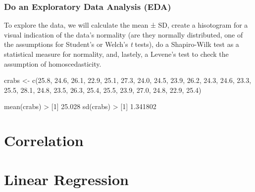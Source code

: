 \documentclass[
  letterpaper,
]{book}
\newenvironment{Shaded}{\begin{snugshade}}{\end{snugshade}}
\newcommand{\DecValTok}[1]{\textcolor[rgb]{0.68,0.00,0.00}{#1}}
\newcommand{\FloatTok}[1]{\textcolor[rgb]{0.68,0.00,0.00}{#1}}
\newcommand{\FunctionTok}[1]{\textcolor[rgb]{0.28,0.35,0.67}{#1}}
\newcommand{\NormalTok}[1]{\textcolor[rgb]{0.00,0.23,0.31}{#1}}
\newcommand{\OtherTok}[1]{\textcolor[rgb]{0.00,0.23,0.31}{#1}}
\newcommand{\SpecialCharTok}[1]{\textcolor[rgb]{0.37,0.37,0.37}{#1}}
\begin{document}
\subsection{Do an Exploratory Data Analysis
(EDA)}\label{do-an-exploratory-data-analysis-eda}

To explore the data, we will calculate the mean ± SD, create a
hisotogram for a visual indication of the data's normality (are they
normally distributed, one of the assumptions for Student's or Welch's
\emph{t} tests), do a Shapiro-Wilk test as a statistical measure for
normality, and, lastely, a Levene's test to check the assumption of
homoscedasticity.

\begin{Shaded}
\begin{Highlighting}[]
\NormalTok{crabs }\OtherTok{\textless{}{-}} \FunctionTok{c}\NormalTok{(}\FloatTok{25.8}\NormalTok{, }\FloatTok{24.6}\NormalTok{, }\FloatTok{26.1}\NormalTok{, }\FloatTok{22.9}\NormalTok{, }\FloatTok{25.1}\NormalTok{, }\FloatTok{27.3}\NormalTok{, }\FloatTok{24.0}\NormalTok{, }\FloatTok{24.5}\NormalTok{, }\FloatTok{23.9}\NormalTok{,}
           \FloatTok{26.2}\NormalTok{, }\FloatTok{24.3}\NormalTok{, }\FloatTok{24.6}\NormalTok{, }\FloatTok{23.3}\NormalTok{, }\FloatTok{25.5}\NormalTok{, }\FloatTok{28.1}\NormalTok{, }\FloatTok{24.8}\NormalTok{, }\FloatTok{23.5}\NormalTok{, }\FloatTok{26.3}\NormalTok{,}
           \FloatTok{25.4}\NormalTok{, }\FloatTok{25.5}\NormalTok{, }\FloatTok{23.9}\NormalTok{, }\FloatTok{27.0}\NormalTok{, }\FloatTok{24.8}\NormalTok{, }\FloatTok{22.9}\NormalTok{, }\FloatTok{25.4}\NormalTok{)}

\FunctionTok{mean}\NormalTok{(crabs)}
\SpecialCharTok{\textgreater{}}\NormalTok{ [}\DecValTok{1}\NormalTok{] }\FloatTok{25.028}
\FunctionTok{sd}\NormalTok{(crabs)}
\SpecialCharTok{\textgreater{}}\NormalTok{ [}\DecValTok{1}\NormalTok{] }\FloatTok{1.341802}
\end{Highlighting}
\end{Shaded}

\chapter{Correlation}\label{sec-correlation}

\chapter{Linear Regression}\label{sec-simple-linear-regression}
\end{document}
